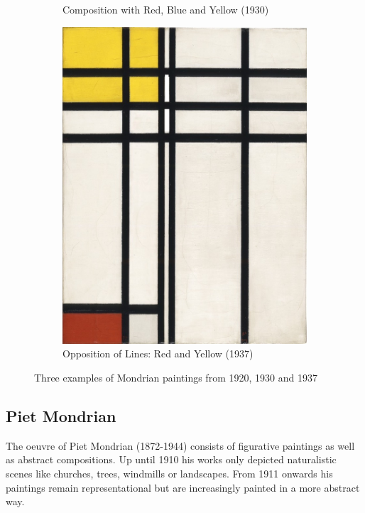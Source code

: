 \documentclass[serif,article,noparskip]{agse-thesis}
\begin{document}
\begin{figure}
\begin{subfigure}{.3\textwidth}
  \caption{Composition with Red, Blue and Yellow (1930)}
  \label{fig:sub2}
\end{subfigure}
\begin{subfigure}{.3\textwidth}
  \centering
  \includegraphics[width=\linewidth]{images/B273.jpg}
  \caption{Opposition of Lines: Red and Yellow (1937)}
  \label{fig:sub3}
\end{subfigure}
\caption{Three examples of Mondrian paintings from 1920, 1930 and 1937}
\label{fig:mondrian}
\end{figure}

\subsection{Piet Mondrian}

The oeuvre of Piet Mondrian (1872-1944) consists of figurative paintings as well
as abstract compositions. Up until 1910 his works only depicted naturalistic
scenes like churches, trees, windmills or landscapes. From 1911 onwards his
paintings remain representational but are increasingly painted in a more
abstract way.
\end{document}
